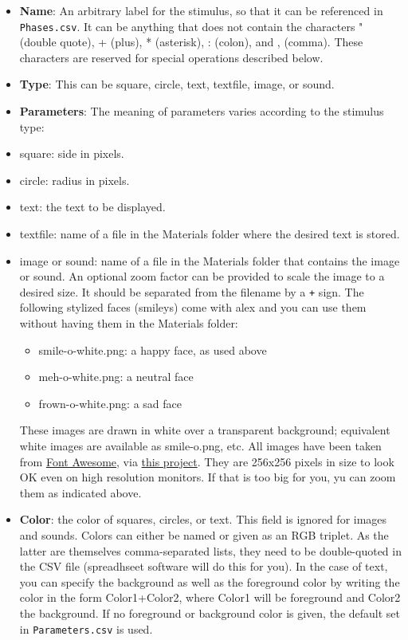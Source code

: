 \documentclass[11pt,]{article}
\begin{document}
\begin{itemize}
\item
  \textbf{Name}: An arbitrary label for the stimulus, so that it can be
  referenced in \texttt{Phases.csv}. It can be anything that does not
  contain the characters " (double quote), + (plus), * (asterisk), :
  (colon), and , (comma). These characters are reserved for special
  operations described below.
\item
  \textbf{Type}: This can be square, circle, text, textfile, image, or
  sound.
\item
  \textbf{Parameters}: The meaning of parameters varies according to the
  stimulus type:
\item
  square: side in pixels.
\item
  circle: radius in pixels.
\item
  text: the text to be displayed.
\item
  textfile: name of a file in the Materials folder where the desired
  text is stored.
\item
  image or sound: name of a file in the Materials folder that contains
  the image or sound. An optional zoom factor can be provided to scale
  the image to a desired size. It should be separated from the filename
  by a \texttt{+} sign. The following stylized faces (smileys) come with
  alex and you can use them without having them in the Materials folder:

  \begin{itemize}
  \item
    smile-o-white.png: a happy face, as used above
  \item
    meh-o-white.png: a neutral face
  \item
    frown-o-white.png: a sad face
  \end{itemize}

  These images are drawn in white over a transparent background;
  equivalent white images are available as smile-o.png, etc. All images
  have been taken from
  \href{http://fortawesome.github.io/Font-Awesome}{Font Awesome}, via
  \href{https://github.com/encharm/Font-Awesome-SVG-PNG}{this project}.
  They are 256x256 pixels in size to look OK even on high resolution
  monitors. If that is too big for you, yu can zoom them as indicated
  above.
\item
  \textbf{Color}: the color of squares, circles, or text. This field is
  ignored for images and sounds. Colors can either be named or given as
  an RGB triplet. As the latter are themselves comma-separated lists,
  they need to be double-quoted in the CSV file (spreadhseet software
  will do this for you). In the case of text, you can specify the
  background as well as the foreground color by writing the color in the
  form Color1+Color2, where Color1 will be foreground and Color2 the
  background. If no foreground or background color is given, the default
  set in \texttt{Parameters.csv} is used.
\end{itemize}
\end{document}
